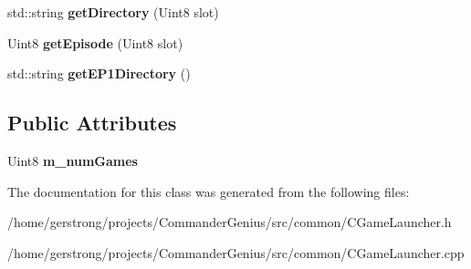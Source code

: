 \begin{DoxyCompactItemize}
\item 
\hypertarget{class_c_game_launcher_a04d73b303fcbd723927b76d9b2ee2d7d}{
std::string {\bfseries getDirectory} (Uint8 slot)}
\label{class_c_game_launcher_a04d73b303fcbd723927b76d9b2ee2d7d}

\item 
\hypertarget{class_c_game_launcher_a19216e3402983680304d13f491663d7d}{
Uint8 {\bfseries getEpisode} (Uint8 slot)}
\label{class_c_game_launcher_a19216e3402983680304d13f491663d7d}

\item 
\hypertarget{class_c_game_launcher_a9412246c503410c36b131fdd16a55394}{
std::string {\bfseries getEP1Directory} ()}
\label{class_c_game_launcher_a9412246c503410c36b131fdd16a55394}

\end{DoxyCompactItemize}
\subsection*{Public Attributes}
\begin{DoxyCompactItemize}
\item 
\hypertarget{class_c_game_launcher_a0679c22a283a96fd1d78933c1fb09252}{
Uint8 {\bfseries m\_\-numGames}}
\label{class_c_game_launcher_a0679c22a283a96fd1d78933c1fb09252}

\end{DoxyCompactItemize}


The documentation for this class was generated from the following files:\begin{DoxyCompactItemize}
\item 
/home/gerstrong/projects/CommanderGenius/src/common/CGameLauncher.h\item 
/home/gerstrong/projects/CommanderGenius/src/common/CGameLauncher.cpp\end{DoxyCompactItemize}
